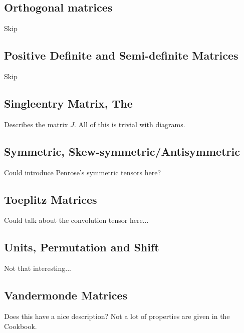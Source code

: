 \subsection{Orthogonal matrices}
Skip
\subsection{Positive Definite and Semi-definite Matrices}
Skip
\subsection{Singleentry Matrix, The}
Describes the matrix $J$.
All of this is trivial with diagrams.
\subsection{Symmetric, Skew-symmetric/Antisymmetric}

Could introduce Penrose's symmetric tensors here?

\subsection{Toeplitz Matrices}
Could talk about the convolution tensor here...
\subsection{Units, Permutation and Shift}
Not that interesting...
\subsection{Vandermonde Matrices}
Does this have a nice description?
Not a lot of properties are given in the Cookbook.


